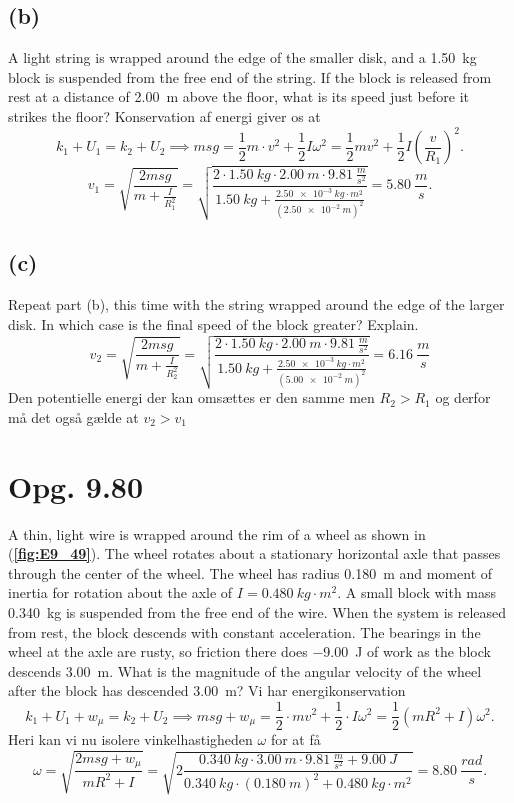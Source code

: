 \documentclass[12pt]{article}
\begin{document}
\subsection*{(b)}
A light string is wrapped around the edge of the smaller disk, and a \qty{1,50}{kg} block is suspended from the free end of the string. If the block is released from rest at a distance of \qty{2,00}{m} above the floor, what is its speed just before it strikes the floor?
\bigbreak
Konservation af energi giver os at
\[
k_1+U_1=k_2+U_2 \implies msg = \frac{1}{2}m\cdot v^2 + \frac{1}{2}I\omega^2 = \frac{1}{2}mv^2 + \frac{1}{2}I\left( \frac{v}{R_1} \right)^2
.\]
\[
v_1 = \sqrt{\frac{2msg}{m + \frac{I}{R_1^2}}} = \sqrt{\frac{2\cdot \qty{1,50}{kg}\cdot \qty{2,00}{m}\cdot \qty{9,81}{\frac{m}{s^2}}}{\qty{1,50}{kg} + \frac{\qty{2,50e-3}{kg\cdot m^2}}{(\qty{2,50e-2}{m})^2}}} = \qty{5,80}{\frac{m}{s}} 
.\] 


\subsection*{(c)}
Repeat part (b), this time with the string wrapped around the edge of the larger disk. In which case is the final speed of the block greater? Explain.
\bigbreak
\[
v_2 = \sqrt{\frac{2msg}{m + \frac{I}{R_2^2}}} = \sqrt{\frac{2\cdot \qty{1,50}{kg}\cdot \qty{2,00}{m}\cdot \qty{9,81}{\frac{m}{s^2}}}{\qty{1,50}{kg} + \frac{\qty{2,50e-3}{kg\cdot m^2}}{(\qty{5,00e-2}{m})^2}}} = \qty{6,16}{\frac{m}{s}} 
\]
Den potentielle energi der kan omsættes er den samme men $R_2 > R_1$ og derfor må det også gælde at $v_2 > v_1$

\section*{Opg. 9.80}
A thin, light wire is wrapped around the rim of a wheel as shown in (\textbf{\autoref{fig:E9_49}}). The wheel rotates about a stationary horizontal axle that passes through the center of the wheel. The wheel has radius \qty{0,180}{m} and moment of inertia for rotation about the axle of $I = \qty{0,480}{kg \cdot m^2}$. A small block with mass \qty{0,340}{kg} is suspended from the free end of the wire. When the system is released from rest, the block descends with constant acceleration. The bearings in the wheel at the axle are rusty, so friction there does \qty{-9,00}{J} of work as the block descends \qty{3,00}{m}. What is the magnitude of the angular velocity of the wheel after the block has descended \qty{3,00}{m}?
\bigbreak
Vi har energikonservation
\[
k_1 + U_1 + w_{\mu} = k_2 + U_2 \implies msg + w_{\mu} = \frac{1}{2}\cdot mv^2 + \frac{1}{2}\cdot I \omega^2 = \frac{1}{2}\left( mR^2 + I \right)\omega^2
.\] 
Heri kan vi nu isolere vinkelhastigheden $\omega$ for at få
\[
\omega = \sqrt{\frac{2msg + w_{\mu}}{mR^2 + I}} = \sqrt{2\frac{\qty{0,340}{kg} \cdot \qty{3,00}{m} \cdot \qty{9,81}{\frac{m}{s^2}} + \qty{9,00}{J}}{\qty{0,340}{kg} \cdot (\qty{0,180}{m})^2 + \qty{0,480}{kg\cdot m^2}}} = \qty{8,80}{\frac{rad}{s}} 
.\] 
\end{document}
